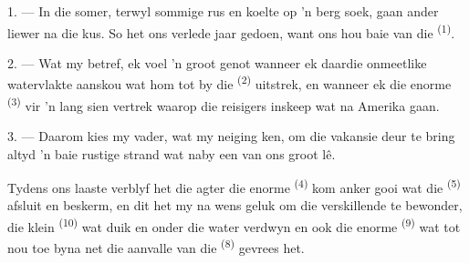 %
%
%

\VUsaut{4.0mm}
\VUsaut{3.0mm}
\VUsaut{3.0mm}

1. --- In die somer, terwyl sommige rus en koelte op 'n berg soek, gaan ander liewer na
die kus. So het ons verlede jaar gedoen, want ons hou baie van die 
\textsuperscript{(1)}.

2. --- Wat my betref, ek voel 'n groot genot wanneer ek daardie onmeetlike watervlakte
aanskou wat hom tot by die  \textsuperscript{(2)} uitstrek, en wanneer ek
die enorme  \textsuperscript{(3)} vir 'n lang  sien
vertrek waarop die reisigers inskeep wat na Amerika gaan.

3. --- Daarom kies my vader, wat my neiging ken, om die vakansie deur te bring altyd 'n
baie rustige strand wat naby een van ons groot  lê.

Tydens ons laaste verblyf het die  agter die enorme 
\textsuperscript{(4)} kom anker gooi wat die  \textsuperscript{(5)}
afsluit en beskerm, en dit het my na wens geluk om die verskillende
 te bewonder, die klein  \textsuperscript{(10)} wat
duik en onder die water verdwyn en ook die enorme 
\textsuperscript{(9)} wat tot nou toe byna net die aanvalle van die 
\textsuperscript{(8)} gevrees het.

